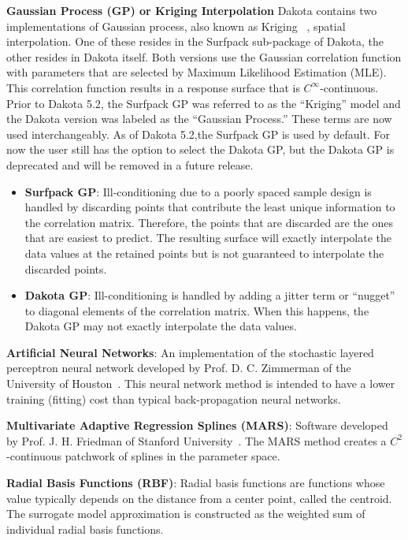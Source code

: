 \textbf{Gaussian Process (GP) or Kriging Interpolation}
Dakota contains two implementations of Gaussian process, also known as 
Kriging ~\cite{Giu98}, spatial interpolation.  One of these resides in 
the Surfpack sub-package of Dakota, the other resides in Dakota itself.
Both versions use the Gaussian correlation function with parameters that
are selected by Maximum Likelihood Estimation (MLE). This correlation 
function results in a response surface that is $C^\infty$-continuous.
Prior to Dakota 5.2, the Surfpack GP was referred to as the ``Kriging'' 
model and the Dakota version was labeled as the ``Gaussian Process.''  
These terms are now used interchangeably.  As of Dakota 5.2,the 
Surfpack GP is used by default.  For now the user still has the option 
to select the Dakota GP, but the Dakota GP is deprecated and will be 
removed in a future release.
\begin{itemize}
\item \textbf{Surfpack GP}: Ill-conditioning due to a poorly spaced sample 
      design is handled by discarding points that contribute the least 
      unique information to the correlation matrix.  Therefore, the points 
      that are discarded are the ones that are easiest to predict.  The 
      resulting surface will exactly interpolate the data values at the 
      retained points but is not guaranteed to interpolate the discarded 
      points.
\item \textbf{Dakota GP}: Ill-conditioning is handled by adding a jitter 
      term or ``nugget'' to diagonal elements of the correlation matrix. 
      When this happens, the Dakota GP may not exactly interpolate the 
      data values.
\end{itemize}

\textbf{Artificial Neural Networks}: An implementation of the
stochastic layered perceptron neural network developed by Prof. D. C.
Zimmerman of the University of Houston~\cite{Zim96}. This neural network
method is intended to have a lower training (fitting) cost than
typical back-propagation neural networks.

\textbf{Multivariate Adaptive Regression Splines (MARS)}: Software
developed by Prof. J. H. Friedman of Stanford University~\cite{Fri91}.
The MARS method creates a $C^2$-continuous patchwork of splines in the
parameter space.

\textbf{Radial Basis Functions (RBF)}:  Radial basis functions are 
functions whose value typically depends on the distance from a center point, 
called the centroid.  The surrogate model approximation is constructed
as the weighted sum of individual radial basis functions. 

